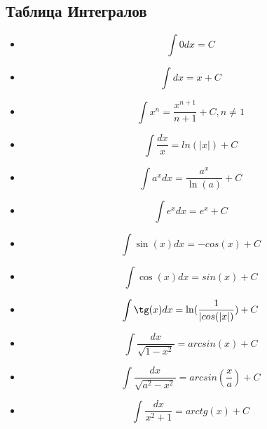 \documentclass[oneside]{book}
\begin{document}
\begin{enumerate}
\begin{itemize}
\begin{enumerate}
\section{Таблица Интегралов\\}
\begin{itemize}
  \item \begin{equation}
    \int 0 dx = C
  \end{equation}
  \item \begin{equation}
    \int dx = x + C
  \end{equation}
  \item \begin{equation}
    \int x^n = \frac{x^{n+1}}{n+1}+C, n \neq 1
  \end{equation}
  \item \begin{equation}
    \int \frac{dx}{x} = ln(|x|) + C
  \end{equation}
  \item \begin{equation}
    \int a^x dx = \frac{a^x}{\ln(a)} + C
  \end{equation}
  \item \begin{equation}
    \int e^x dx = e^x + C
  \end{equation}
  \item \begin{equation}
    \int \sin(x) dx = -cos(x) + C
  \end{equation}
  \item \begin{equation}
    \int \cos(x) dx = sin(x) + C
  \end{equation}
  \item \begin{equation}
    \int \tg(x) dx = \ln(\frac{1}{|cos(|x|)}) + C
  \end{equation}
  \item \begin{equation}
    \int \frac{dx}{\sqrt{1 - x^2}} = arcsin(x) + C
  \end{equation}
  \item \begin{equation}
    \int \frac{dx}{\sqrt{a^2 - x^2}} = arcsin(\frac{x}{a}) + C
  \end{equation}
  \item \begin{equation}
    \int \frac{dx}{x^2 + 1} = arctg(x) + C

\end{equation}
\end{itemize}
\end{enumerate}
\end{itemize}
\end{enumerate}
\end{document}
